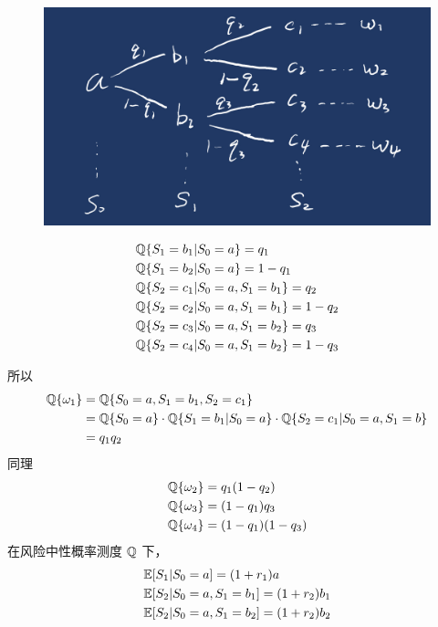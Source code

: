 \vspace{1em}
\begin{minipage}{0.5\textwidth}
    \begin{figure}[H]
        \centering
        \includegraphics[width=\textwidth]{figures/二期二叉树.jpeg} %
    \end{figure}
\end{minipage}
\begin{minipage}{0.5\textwidth}
    \[
    \begin{aligned}
        &\mathbb{Q}\{S_1=b_1|S_0=a\}=q_1\\
        &\mathbb{Q}\{S_1=b_2|S_0=a\}=1-q_1\\
        &\mathbb{Q}\{S_2=c_1|S_0=a,S_1=b_1\}=q_2\\
        &\mathbb{Q}\{S_2=c_2|S_0=a,S_1=b_1\}=1-q_2\\
        &\mathbb{Q}\{S_2=c_3|S_0=a,S_1=b_2\}=q_3\\
        &\mathbb{Q}\{S_2=c_4|S_0=a,S_1=b_2\}=1-q_3\\
    \end{aligned}
    \]
\end{minipage}
所以
\[
\begin{aligned}
    \mathbb{Q}\{\omega_1\}&=\mathbb{Q}\{S_0=a,S_1=b_1,S_2=c_1\}\\
    &=\mathbb{Q}\{S_0=a\}\cdot \mathbb{Q}\{S_1=b_1|S_0=a\}\cdot \mathbb{Q}\{S_2=c_1|S_0=a,S_1=b\}\\
    &=q_1q_2
\end{aligned}
\]
同理
\[
\begin{aligned}
    &\mathbb{Q}\{\omega_2\}=q_1(1-q_2)\\
    &\mathbb{Q}\{\omega_3\}=(1-q_1)q_3\\
    &\mathbb{Q}\{\omega_4\}=(1-q_1)(1-q_3)
\end{aligned}
\]
在风险中性概率测度 $\mathbb{Q}$ 下，
\[
\begin{aligned}
    &\mathbb E[S_1|S_0=a]=(1+r_1)a\\
    &\mathbb E[S_2|S_0=a,S_1=b_1]=(1+r_2)b_1\\
    &\mathbb E[S_2|S_0=a,S_1=b_2]=(1+r_2)b_2
\end{aligned}
\]
